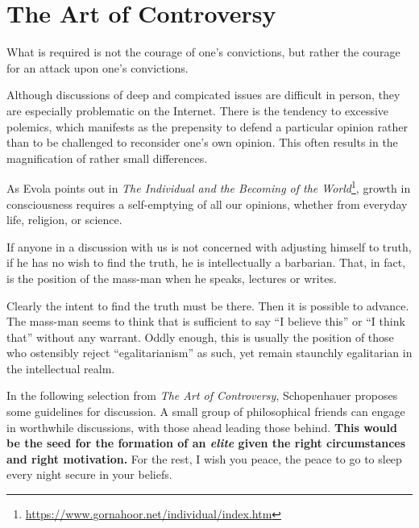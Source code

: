 \section{The Art of Controversy}

\begin{quotex}
What is required is not the courage of one's convictions, but rather the courage for an attack upon one's convictions.
\end{quotex}


Although discussions of deep and compicated issues are difficult in person, they are especially problematic on the Internet. There is the tendency to excessive polemics, which manifests as the prepensity to defend a particular opinion rather than to be challenged to reconsider one's own opinion. This often results in the magnification of rather small differences.

As Evola points out in \textit{The Individual and the Becoming of the World}\footnote{\url{https://www.gornahoor.net/individual/index.htm}}, growth in consciousness requires a self-emptying of all our opinions, whether from everyday life, religion, or science.

\begin{quotex}
If anyone in a discussion with us is not concerned with adjusting himself to truth, if he has no wish to find the truth, he is intellectually a barbarian. That, in fact, is the position of the mass-man when he speaks, lectures or writes.
\end{quotex}


Clearly the intent to find the truth must be there. Then it is possible to advance. The mass-man seems to think that is sufficient to say ``I believe this'' or ``I think that'' without any warrant. Oddly enough, this is usually the position of those who ostensibly reject ``egalitarianism'' as such, yet remain staunchly egalitarian in the intellectual realm.

In the following selection from \emph{The Art of Controversy}, Schopenhauer proposes some guidelines for discussion. A small group of philosophical friends can engage in worthwhile discussions, with those ahead leading those behind. \textbf{This would be the seed for the formation of an \emph{elite} given the right circumstances and right motivation.} For the rest, I wish you peace, the peace to go to sleep every night secure in your beliefs.

